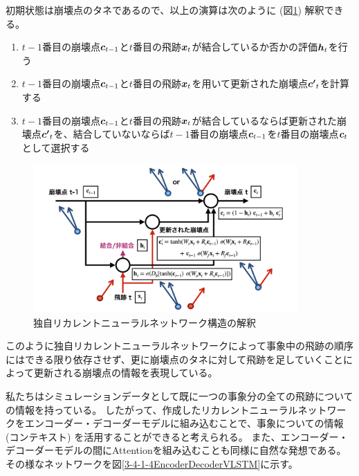 初期状態は崩壊点のタネであるので、以上の演算は次のように (図\ref{3-4-1-3Interpretation}) 解釈できる。

\begin{enumerate}
 \item $t-1$番目の崩壊点${\mbox{\boldmath{$c$}}}_{t-1}$と$t$番目の飛跡${\mbox{\boldmath{$x$}}}_{t}$が結合しているか否かの評価${\mbox{\boldmath{$h$}}}_{t}$を行う
 \item $t-1$番目の崩壊点${\mbox{\boldmath{$c$}}}_{t-1}$と$t$番目の飛跡${\mbox{\boldmath{$x$}}}_{t}$を用いて更新された崩壊点${\mbox{\boldmath{$c'$}}}_{t}$を計算する
 \item $t-1$番目の崩壊点${\mbox{\boldmath{$c$}}}_{t-1}$と$t$番目の飛跡${\mbox{\boldmath{$x$}}}_{t}$が結合しているならば更新された崩壊点${\mbox{\boldmath{$c'$}}}_{t}$を、結合していないならば$t-1$番目の崩壊点${\mbox{\boldmath{$c$}}}_{t-1}$を$t$番目の崩壊点${\mbox{\boldmath{$c$}}}_{t}$として選択する
\end{enumerate}

\begin{figure}[htbp]
 \centering
 \includegraphics[width=0.9\textwidth, clip]{Figure/3Networks/3-4-1-3Interpretation.png}
 \caption{独自リカレントニューラルネットワーク構造の解釈}
 \label{3-4-1-3Interpretation}
\end{figure}

このように独自リカレントニューラルネットワークによって事象中の飛跡の順序にはできる限り依存させず、更に崩壊点のタネに対して飛跡を足していくことによって更新される崩壊点の情報を表現している。

私たちはシミュレーションデータとして既に一つの事象分の全ての飛跡についての情報を持っている。
したがって、作成したリカレントニューラルネットワークをエンコーダー・デコーダーモデルに組み込むことで、事象についての情報 (コンテキスト) を活用することができると考えられる。
また、エンコーダー・デコーダーモデルの間にAttentionを組み込むことも同様に自然な発想である。
その様なネットワークを図\ref{3-4-1-4EncoderDecoderVLSTM}に示す。

